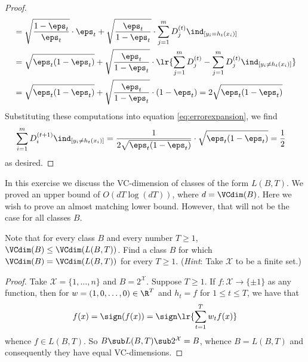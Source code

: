 \documentclass[12pt]{article}
\begin{document}
\begin{proof}
\begin{align*}
    &= \sqrt{\frac{1-\eps_{t}}{\eps_{t}}} \cdot \eps_{t} + \sqrt{\frac{\eps_{t}}{1-\eps_{t}}}\cdot\sum_{j=1}^{m}D_{j}^{(t)}  \ind_{[y_{i}=h_{t}(x_{i})]}\\
    &= \sqrt{\eps_{t}(1-\eps_{t})} + \sqrt{\frac{\eps_{t}}{1-\eps_{t}}}\cdot\lr{\sum_{j=1}^{m}D_{j}^{(t)} -\sum_{j=1}^{m}D_{j}^{(t)}\ind_{[y_{i}\neq h_{t}(x_{i})]}}\\
    &= \sqrt{\eps_{t}(1-\eps_{t})} + \sqrt{\frac{\eps_{t}}{1-\eps_{t}}}\cdot(1 -\eps_{t}) = 2\sqrt{\eps_{t}(1-\eps_{t})}\\
  \end{align*}
  Substituting these computations into equation \eqref{eq:errorexpansion}, we find
  \begin{align*}
    \sum_{i=1}^{m}D_{i}^{(t+1)}\ind_{[y_{i}\neq h_{t}(x_{i})]} &= \frac{1}{2\sqrt{\eps_{t}(1-\eps_{t})}} \cdot \sqrt{\eps_{t}(1-\eps_{t})} = \frac{1}{2}
  \end{align*}
  as desired.
\end{proof}

\begin{homeworkProblem}
  In this exercise we discuss the VC-dimension of classes of the form $ L(B,T) $. We proved an upper bound of $ O(dT \log(dT)) $, where $ d= \VCdim(B) $. Here we wish to prove an almost matching lower bound. However, that will not be the case for all classes $ B $.

  Note that for every class $ B $ and every number $ T\geq 1 $, $ \VCdim(B)\leq \VCdim(L(B,T)) $. Find a class $ B $ for which $ \VCdim(B) = \VCdim(L(B,T)) $ for every $ T\geq 1 $. (\textit{Hint}: Take $ \mathcal{X} $ to be a finite set.)
\end{homeworkProblem}

\begin{proof}
  Take $ \mathcal{X} = \{1,\ldots, n\} $ and $ B = 2^{\mathcal{X}} $. Suppose $ T\geq 1 $. If $ f:\mathcal{X}\to\{\pm1\} $ as any function, then for $ w = (1,0,\ldots,0)\in \R^{T} $ and $ h_{t} = f $ for $ 1\leq t\leq T $, we have that 
  \[
    f(x) = \sign(f(x)) = \sign\lr{\sum_{t=1}^{T}w_{t}f(x)}
  \]
  whence $ f\in L(B,T) $. So $ B\sub L(B,T) \sub 2^{\mathcal{X}} = B $, whence $ B=L(B,T) $ and consequently they have equal VC-dimensions.
\end{proof}
\end{document}
